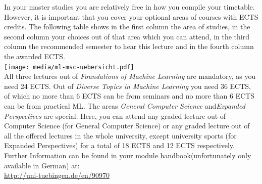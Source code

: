 In your master studies you are relatively free in how you compile your timetable. However, it is important that you cover your optional areas of courses with ECTS credits. The following table shows in the first column the area of studies, in the second column your choices out of that area which you can attend, in the third column the recommended semester to hear this lecture and in the fourth column the awarded ECTS.\\
\texttt{[image: media/ml-msc-uebersicht.pdf]}~\\
All three lectures out of \emph{Foundations of Machine Learning} are mandatory, as you need 24 ECTS. Out of \emph{Diverse Topics in Machine Learning} you need 36 ECTS, of which no more than 6 ECTS can be from seminars and no more than 6 ECTS can be from practical ML. The areas \emph{General Computer Science} and\emph{Expanded Perspectives} are special. Here, you can attend any graded lecture out of Computer Science (for General Computer Science) or any graded lecture out
of all the offered lectures in the whole university, except university sports (for Expanded Perspectives) for a total of 18 ECTS and 12 ECTS respectively.
Further Information can be found in your module handbook(unfortunately only available in German) at:\\
\url{http://uni-tuebingen.de/en/90970}
